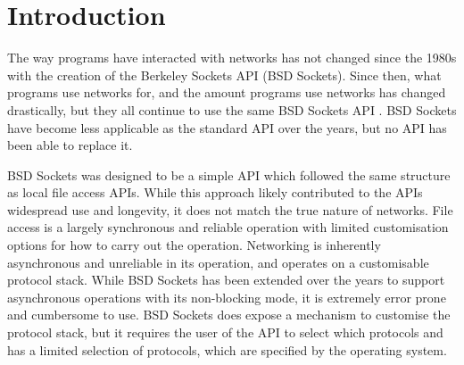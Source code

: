 \documentclass{l4proj}
\begin{document}
%
%
%
%
%
%
%
%
\chapter{Introduction}\label{ch:introduction}


The way programs have interacted with networks has not changed since the 1980s with the creation of the Berkeley Sockets
API (BSD Sockets).
Since then, what programs use networks for, and the amount programs use networks has changed drastically, but they all
continue to use the same BSD Sockets API .
BSD Sockets have become less applicable as the standard API over the years, but no API has been able to replace it.

BSD Sockets was designed to be a simple API which followed the same structure as local file access APIs.
While this approach likely contributed to the APIs widespread use and longevity, it does not match the true nature of
networks.
File access is a largely synchronous and reliable operation with limited customisation options for how to carry out the
operation.
Networking is inherently asynchronous and unreliable in its operation, and operates on a customisable protocol stack.
While BSD Sockets has been extended over the years to support asynchronous operations with its non-blocking mode, it is
extremely error prone and cumbersome to use.
BSD Sockets does expose a mechanism to customise the protocol stack, but it requires the user of the API to select which
protocols and has a limited selection of protocols, which are specified by the operating system.
\end{document}
